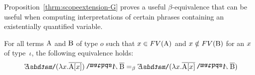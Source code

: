 Proposition~\ref{thrm:scopeextension-G}  proves a useful $\beta$-equivalence that can be useful when computing interpretations of certain phrases containing an existentially quantified variable.
\begin{proposition} For all terms $\A1$ and $\B1$ of type $o$ such that  $\x1 \in FV(\A1)$ and $\x1 \notin FV(\B1)$ for an $\x1$ of type~$\iota$, the following equivalence holds: \label{thrm:scopeextension-G}
\begin{align*}
  {\ex2} (\lambda \x1.  \tr{\A1[\x1]}) \cnj2 \tr{\B1}  =_{\beta}  \ex2 (\lambda \x1.  \tr{\A1[\x1]}  \cnj2  \tr{\B1} ) 
\end{align*} 
\end{proposition}
%
